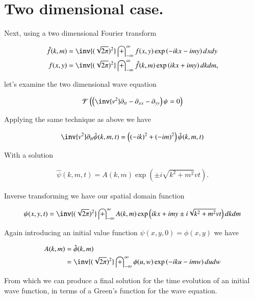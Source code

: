 \documentclass{article}
\newcommand{\FF}[0]{\mathcal{F}}
\newcommand{\IIinf}[0]{ \int_{-\infty}^\infty }
\begin{document}
\section{ Two dimensional case. }

Next, using a two dimensional Fourier transform

\begin{align*}
\hat{f}(k,m) &= \inv{(\sqrt{2\pi})^2} \IIinf f(x,y) \exp\left( -i k x - i m y \right) dx dy \\
{f}(x,y) &= \inv{(\sqrt{2\pi})^2} \IIinf \hat{f}(k,m) \exp\left( i k x + i m y \right) dk dm,
\end{align*}

let's examine the two dimensional wave equation

\begin{align*}
\FF\left( \left(\inv{v^2} \partial_{tt} -\partial_{xx} -\partial_{yy} \right)\psi = 0 \right)
\end{align*}

Applying the same technique as above we have

\begin{align*}
\inv{v^2}\partial_{tt}\hat{\psi}(k,m,t) = \left((-i k)^2 + (-i m)^2\right) \hat{\psi}(k,m,t)
\end{align*}

With a solution 

\begin{align*}
\hat{\psi}(k,m,t) = A(k,m) \exp\left( \pm i \sqrt{k^2 + m^2} v t \right).
\end{align*}

Inverse transforming we have our spatial domain function

\begin{align*}
{\psi}(x,y,t) = \inv{(\sqrt{2\pi})^2} \IIinf A(k,m) \exp\left( i k x + i m y \pm i \sqrt{k^2 + m^2} v t \right) dk dm
\end{align*}

Again introducing an initial value function $\psi(x,y,0) = \phi(x,y)$ we have

\begin{align*}
A(k,m) 
&= \hat{\phi}(k,m) \\
&= \inv{(\sqrt{2\pi})^2} \IIinf \phi(u,w) \exp\left( -i k u - i m w \right) du dw
\end{align*}

From which we can produce a final solution for the time evolution of an initial wave function, in terms of a Green's function
for the wave equation.
\end{document}
